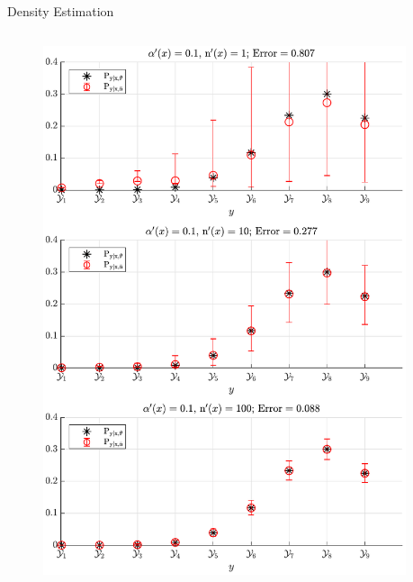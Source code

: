 \documentclass[final]{beamer}
\begin{document}
\begin{frame}{}
\begin{columns}[T]
\begin{column}{.34\linewidth}
\begin{block}{Density Estimation}
\begin{columns}[t]
\begin{column}{.5\linewidth}
\begin{figure}
\centering
\includegraphics[width=0.9\linewidth]{P_yx_error_a0_0_1.pdf}
\end{figure}

\end{column}
\begin{column}{.5\linewidth}


\end{column}
\end{columns}
\end{block}
\end{column}
\end{columns}
\end{frame}
\end{document}
